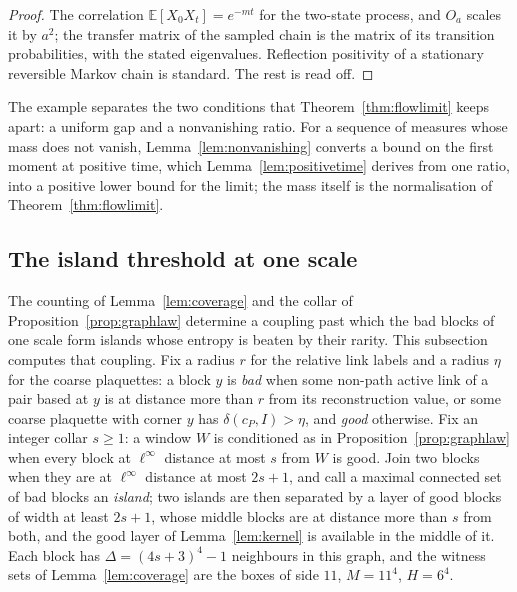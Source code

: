 \documentclass[11pt]{amsart}
\theoremstyle{definition}
\theoremstyle{remark}
\numberwithin{equation}{section}
\newcommand{\E}{\mathbb{E}}
\begin{document}
\begin{proof}
The correlation $\E[X_0X_t]=e^{-mt}$ for the two-state process, and
$O_a$ scales it by $a^2$; the transfer matrix of the sampled chain is the
matrix of its transition probabilities, with the stated eigenvalues.
Reflection positivity of a stationary reversible Markov chain is
standard. The rest is read off.
\end{proof}

The example separates the two conditions that Theorem~\ref{thm:flowlimit}
keeps apart: a uniform gap and a nonvanishing ratio. For a sequence of
measures whose mass does not vanish, Lemma~\ref{lem:nonvanishing} converts
a bound on the first moment at positive time, which Lemma~\ref{lem:positivetime}
derives from one ratio, into a positive lower bound for the limit; the
mass itself is the normalisation of Theorem~\ref{thm:flowlimit}.

\subsection{The island threshold at one scale}\label{ssec:islandthreshold}

The counting of Lemma~\ref{lem:coverage} and the collar of
Proposition~\ref{prop:graphlaw} determine a coupling past which the bad
blocks of one scale form islands whose entropy is beaten by their rarity.
This subsection computes that coupling. Fix a radius $r$ for the relative
link labels and a radius $\eta$ for the coarse plaquettes: a block $y$ is
\emph{bad} when some non-path active link of a pair based at $y$ is at
distance more than $r$ from its reconstruction value, or some coarse
plaquette with corner $y$ has $\delta(c_P,I)>\eta$, and \emph{good}
otherwise. Fix an integer collar $s\ge1$: a window $W$ is conditioned as in
Proposition~\ref{prop:graphlaw} when every block at $\ell^\infty$ distance
at most $s$ from $W$ is good. Join two blocks when they are at $\ell^\infty$
distance at most $2s+1$, and call a maximal connected set of bad blocks an
\emph{island}; two islands are then separated by a layer of good blocks of
width at least $2s+1$, whose middle blocks are at distance more than $s$
from both, and the good layer of Lemma~\ref{lem:kernel} is
available in the middle of it. Each block has $\varDelta=(4s+3)^4-1$ neighbours
in this graph, and the witness sets of Lemma~\ref{lem:coverage} are the
boxes of side $11$, $M=11^4$, $H=6^4$.
\end{document}
